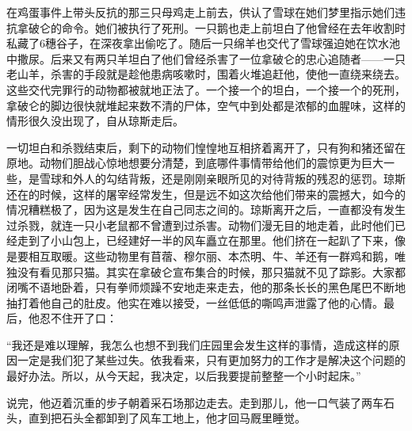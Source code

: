 在鸡蛋事件上带头反抗的那三只母鸡走上前去，供认了雪球在她们梦里指示她们违抗拿破仑的命令。她们被执行了死刑。一只鹅也走上前坦白了他曾经在去年收割时私藏了6穗谷子，在深夜拿出偷吃了。随后一只绵羊也交代了雪球强迫她在饮水池中撒尿。后来又有两只羊坦白了他们曾经杀害了一位拿破仑的忠心追随者——一只老山羊，杀害的手段就是趁他患病咳嗽时，围着火堆追赶他，使他一直绕来绕去。这些交代完罪行的动物都被就地正法了。一个接一个的坦白，一个接一个的死刑，拿破仑的脚边很快就堆起来数不清的尸体，空气中到处都是浓郁的血腥味，这样的情形很久没出现了，自从琼斯走后。

一切坦白和杀戮结束后，剩下的动物们惶惶地互相挤着离开了，只有狗和猪还留在原地。动物们胆战心惊地想要分清楚，到底哪件事情带给他们的震惊更为巨大一些，是雪球和外人的勾结背叛，还是刚刚亲眼所见的对待背叛的残忍的惩罚。琼斯还在的时候，这样的屠宰经常发生，但是远不如这次给他们带来的震撼大，如今的情况糟糕极了，因为这是发生在自己同志之间的。琼斯离开之后，一直都没有发生过杀戮，就连一只小老鼠都不曾遭到过杀害。动物们漫无目的地走着，此时他们已经走到了小山包上，已经建好一半的风车矗立在那里。他们挤在一起趴了下来，像是要相互取暖。这些动物里有苜蓿、穆尔丽、本杰明、牛、羊还有一群鸡和鹅，唯独没有看见那只猫。其实在拿破仑宣布集合的时候，那只猫就不见了踪影。大家都闭嘴不语地卧着，只有拳师烦躁不安地走来走去，他的那条长长的黑色尾巴不断地抽打着他自己的肚皮。他实在难以接受，一丝低低的嘶鸣声泄露了他的心情。最后，他忍不住开了口：

“我还是难以理解，我怎么也想不到我们庄园里会发生这样的事情，造成这样的原因一定是我们犯了某些过失。依我看来，只有更加努力的工作才是解决这个问题的最好办法。所以，从今天起，我决定，以后我要提前整整一个小时起床。”

说完，他迈着沉重的步子朝着采石场那边走去。走到那儿，他一口气装了两车石头，直到把石头全都卸到了风车工地上，他才回马厩里睡觉。

